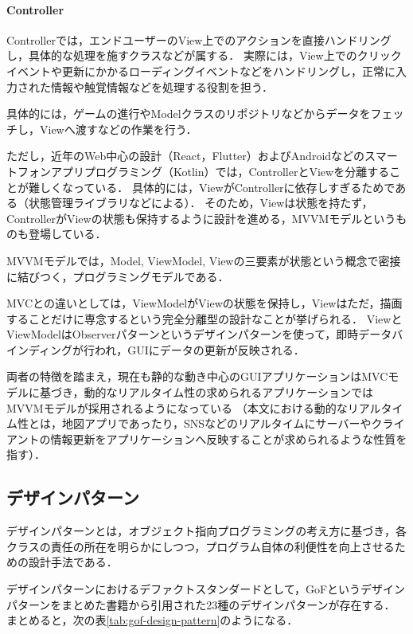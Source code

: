 \documentclass[platex,dvipdfmx,12pt]{jsarticle}
\begin{document}
\paragraph{Controller}
Controllerでは，エンドユーザーのView上でのアクションを直接ハンドリングし，具体的な処理を施すクラスなどが属する．
実際には，View上でのクリックイベントや更新にかかるローディングイベントなどをハンドリングし，正常に入力された情報や触覚情報などを処理する役割を担う．

具体的には，ゲームの進行やModelクラスのリポジトリなどからデータをフェッチし，Viewへ渡すなどの作業を行う．


ただし，近年のWeb中心の設計（React，Flutter）およびAndroidなどのスマートフォンアプリプログラミング（Kotlin）では，ControllerとViewを分離することが難しくなっている．
具体的には，ViewがControllerに依存しすぎるためである（状態管理ライブラリなどによる）．
そのため，Viewは状態を持たず，ControllerがViewの状態も保持するように設計を進める，MVVMモデルというものも登場している．

MVVMモデルでは，Model, ViewModel, Viewの三要素が状態という概念で密接に結びつく，プログラミングモデルである．

MVCとの違いとしては，ViewModelがViewの状態を保持し，Viewはただ，描画することだけに専念するという完全分離型の設計なことが挙げられる．
ViewとViewModelはObserverパターンというデザインパターンを使って，即時データバインディングが行われ，GUIにデータの更新が反映される．

両者の特徴を踏まえ，現在も静的な動き中心のGUIアプリケーションはMVCモデルに基づき，動的なリアルタイム性の求められるアプリケーションではMVVMモデルが採用されるようになっている
（本文における動的なリアルタイム性とは，地図アプリであったり，SNSなどのリアルタイムにサーバーやクライアントの情報更新をアプリケーションへ反映することが求められるような性質を指す）．


\subsection{デザインパターン}
デザインパターンとは，オブジェクト指向プログラミングの考え方に基づき，各クラスの責任の所在を明らかにしつつ，プログラム自体の利便性を向上させるための設計手法である．

デザインパターンにおけるデファクトスタンダードとして，GoFというデザインパターンをまとめた書籍から引用された23種のデザインパターンが存在する．
まとめると，次の表\ref{tab:gof-design-pattern}のようになる．
\end{document}

